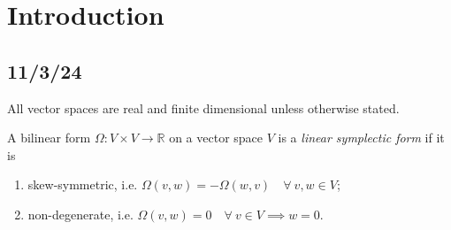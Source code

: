 \documentclass[misc]{subfiles}
\begin{document}
 

\section*{Introduction}\label{Sec: Introduction}
\subsection*{11/3/24}\label{Sec: 11/3/24}
\begin{Nt}\label{Nt: Vector spaces}
    All vector spaces are real and finite dimensional unless otherwise stated.
\end{Nt}

\begin{Dfn}\label{Dfn: Linear symplectic form}
    A bilinear form $\Omega:V\times V\to \mathbb{R}$ on a vector space $V$ is a \emph{linear symplectic form} if it is
    \begin{enumerate}[label=\DfnLbl]

        \item skew-symmetric, i.e. $\Omega(v,w) = -\Omega(w,v) \quad \forall \ v,w\in V$;

        \item non-degenerate, i.e. $\Omega(v,w) = 0 \quad \forall \ v\in V \implies w=0$.
    \end{enumerate}
\end{Dfn}
\end{document}

